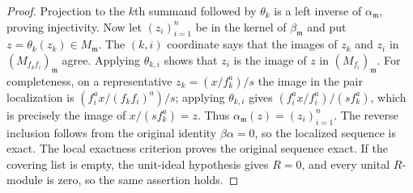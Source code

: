 \begin{proof}
\medskip\noindent
Projection to the $k$th summand followed by $\theta_k$ is a left
inverse of $\alpha_{\mathfrak m}$, proving injectivity.
Now let $(z_i)_{i=1}^n$ be in the kernel of $\beta_{\mathfrak m}$
and put $z=\theta_k(z_k)\in M_{\mathfrak m}$.
The $(k,i)$ coordinate says that the images of $z_k$ and $z_i$
in $(M_{f_kf_i})_{\mathfrak m}$ agree. Applying $\theta_{k,i}$
shows that $z_i$ is the image of $z$ in $(M_{f_i})_{\mathfrak m}$.
For completeness, on a representative $z_k=(x/f_k^a)/s$ the image
in the pair localization is $(f_i^ax/(f_kf_i)^a)/s$; applying
$\theta_{k,i}$ gives $(f_i^ax/f_i^a)/(sf_k^a)$, which is precisely
the image of $x/(sf_k^a)=z$. Thus
$\alpha_{\mathfrak m}(z)=(z_i)_{i=1}^n$.
The reverse inclusion follows from the original identity
$\beta\alpha=0$, so the localized sequence is exact.
The local exactness criterion proves the original sequence exact.
If the covering list is empty, the unit-ideal hypothesis gives $R=0$,
and every unital $R$-module is zero, so the same assertion holds.
\end{proof}